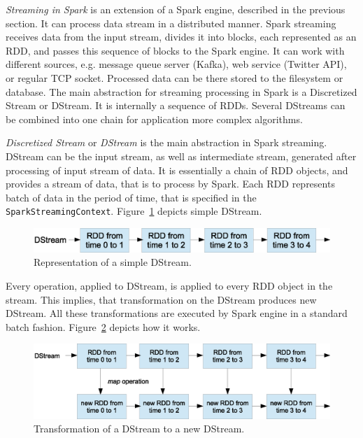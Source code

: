 
\textit{Streaming in Spark}  is an extension of a Spark engine, described in the previous section.
It can process data stream in a distributed manner.
Spark streaming receives data from the input stream, divides it into blocks, each represented as an RDD, and passes this sequence of blocks to the Spark engine.
It can work with different sources, e.g. message queue server (Kafka), web service (Twitter API), or regular TCP socket.
Processed data can be there stored to the filesystem or database.
The main abstraction for streaming processing in Spark is a Discretized Stream or DStream.
It is internally a sequence of RDDs.
Several DStreams can be combined into one chain for application more complex algorithms. 

\textit{Discretized Stream} or \textit{DStream}  is the main abstraction in Spark streaming.
DStream can be the input stream, as well as intermediate stream, generated after processing of input stream of data.
It is essentially a chain of RDD objects, and provides a stream of data, that is to process by Spark.
Each RDD represents batch of data in the period of time, that is specified in the \lstinline{SparkStreamingContext}.
Figure~\ref{fig:SimpleDStream} depicts simple DStream.

\begin{figure}[h]
  \centering
  \includegraphics [width=1.0\textwidth]{images/SimpleDStream}
  \caption{Representation of a simple DStream.}
  \label{fig:SimpleDStream}
\end{figure}

Every operation, applied to DStream, is applied to every RDD object in the stream.
This implies, that transformation on the DStream produces new DStream.
All these transformations are executed by Spark engine in a standard batch fashion.
Figure~\ref{fig:DStreamWithTransformation} depicts how it works.

\begin{figure}[h]
  \centering
  \includegraphics [width=1.0\textwidth]{images/DStreamWithTransformation}
  \caption{Transformation of a DStream to a new DStream.}
  \label{fig:DStreamWithTransformation}
\end{figure}

